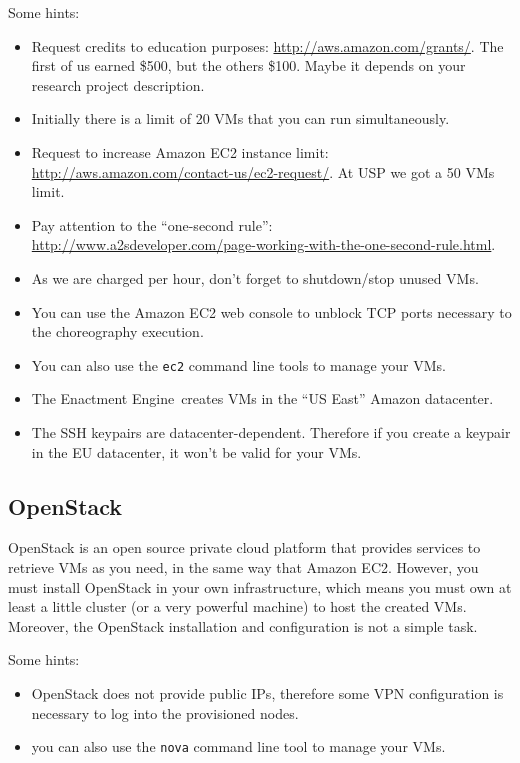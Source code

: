 \documentclass[a4paper, 10pt]{article}
\newcommand{\ee}{Enactment Engine}
\begin{document}
Some hints:

\begin{itemize}
\item Request credits to education purposes: \url{http://aws.amazon.com/grants/}. The first of us earned \$500, but the others \$100. Maybe it depends on your research project description.
\item Initially there is a limit of 20 VMs that you can run simultaneously.
\item Request to increase Amazon EC2 instance limit: \url{http://aws.amazon.com/contact-us/ec2-request/}. At USP we got a 50 VMs limit.
\item Pay attention to the ``one-second rule'': \\ \url{http://www.a2sdeveloper.com/page-working-with-the-one-second-rule.html}.
\item As we are charged per hour, don't forget to shutdown/stop unused VMs.
\item You can use the Amazon EC2 web console to unblock TCP ports necessary to the choreography execution.
\item You can also use the \texttt{ec2} command line tools to manage your VMs.
\item The \ee\ creates VMs in the ``US East'' Amazon datacenter.
\item The SSH keypairs are datacenter-dependent. Therefore if you create a keypair in the EU
datacenter, it won't be valid for your VMs.
\end{itemize}

\subsection{OpenStack}

OpenStack is an open source private cloud platform that provides services to retrieve VMs as you need, in the same way that Amazon EC2. However, you must install OpenStack in your own infrastructure, which means you must own at least a little cluster (or a very powerful machine) to host the created VMs. Moreover, the OpenStack installation and configuration is not a simple task.

Some hints:

\begin{itemize}
\item OpenStack does not provide public IPs, therefore some VPN configuration is necessary to log into the provisioned nodes.
\item you can also use the \texttt{nova} command line tool to manage your VMs.
\end{itemize}
\end{document}

